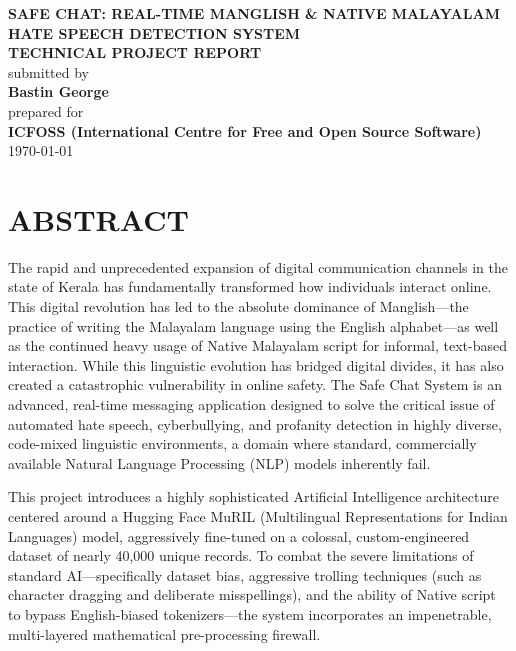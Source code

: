 \documentclass[12pt,a4paper]{report}
\newcommand{\authorname}{Bastin George}
\newcommand{\organization}{ICFOSS (International Centre for Free and Open Source Software)}
\newcommand{\reportmonth}{\today}
\begin{document}

\begin{titlepage}
\begin{center}
\vspace*{1.5cm}
{\Large \textbf{SAFE CHAT: REAL-TIME MANGLISH \& NATIVE MALAYALAM HATE SPEECH DETECTION SYSTEM}}\\[1.5cm]
{\large \textbf{TECHNICAL PROJECT REPORT}}\\[1.5cm]
submitted by\\[0.8cm]
{\large \textbf{\authorname{} }}\\[1.5cm]
prepared for\\[0.8cm]
{\Large \textbf{\organization{}}}\\[0.5cm]
\vfill
{\large \reportmonth{}}
\end{center}
\end{titlepage}

\clearpage
{}
\setcounter{page}{1}

\chapter*{ABSTRACT}
The rapid and unprecedented expansion of digital communication channels in the state of Kerala has fundamentally transformed how individuals interact online. This digital revolution has led to the absolute dominance of Manglish—the practice of writing the Malayalam language using the English alphabet—as well as the continued heavy usage of Native Malayalam script for informal, text-based interaction. While this linguistic evolution has bridged digital divides, it has also created a catastrophic vulnerability in online safety. The Safe Chat System is an advanced, real-time messaging application designed to solve the critical issue of automated hate speech, cyberbullying, and profanity detection in highly diverse, code-mixed linguistic environments, a domain where standard, commercially available Natural Language Processing (NLP) models inherently fail.

This project introduces a highly sophisticated Artificial Intelligence architecture centered around a Hugging Face MuRIL (Multilingual Representations for Indian Languages) model, aggressively fine-tuned on a colossal, custom-engineered dataset of nearly 40,000 unique records. To combat the severe limitations of standard AI—specifically dataset bias, aggressive trolling techniques (such as character dragging and deliberate misspellings), and the ability of Native script to bypass English-biased tokenizers—the system incorporates an impenetrable, multi-layered mathematical pre-processing firewall. 
\end{document}

